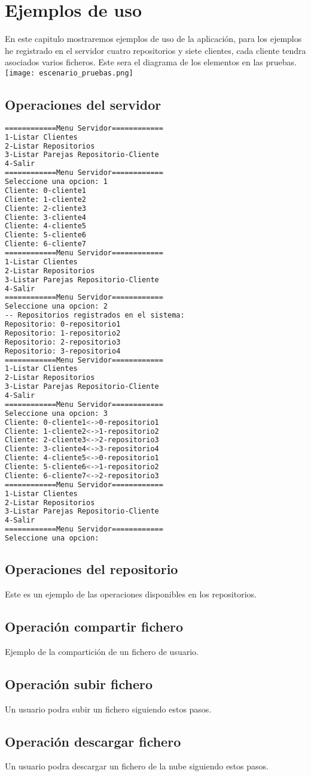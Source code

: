 \chapter{Ejemplos de uso}

En este capitulo mostraremos ejemplos de uso de la aplicación, para los ejemplos he registrado en el servidor cuatro repositorios y siete clientes, cada cliente tendra asociados varios ficheros.
Este sera el diagrama de los elementos en las pruebas.
\texttt{[image: escenario\_pruebas.png]}


\section{Operaciones del servidor}
\begin{lstlisting}[language=bash,frame=single,texcl=true,basicstyle=\small]
============Menu Servidor============
1-Listar Clientes
2-Listar Repositorios
3-Listar Parejas Repositorio-Cliente
4-Salir
============Menu Servidor============
Seleccione una opcion: 1
Cliente: 0-cliente1
Cliente: 1-cliente2
Cliente: 2-cliente3
Cliente: 3-cliente4
Cliente: 4-cliente5
Cliente: 5-cliente6
Cliente: 6-cliente7
============Menu Servidor============
1-Listar Clientes
2-Listar Repositorios
3-Listar Parejas Repositorio-Cliente
4-Salir
============Menu Servidor============
Seleccione una opcion: 2
-- Repositorios registrados en el sistema: 
Repositorio: 0-repositorio1
Repositorio: 1-repositorio2
Repositorio: 2-repositorio3
Repositorio: 3-repositorio4
============Menu Servidor============
1-Listar Clientes
2-Listar Repositorios
3-Listar Parejas Repositorio-Cliente
4-Salir
============Menu Servidor============
Seleccione una opcion: 3
Cliente: 0-cliente1<->0-repositorio1
Cliente: 1-cliente2<->1-repositorio2
Cliente: 2-cliente3<->2-repositorio3
Cliente: 3-cliente4<->3-repositorio4
Cliente: 4-cliente5<->0-repositorio1
Cliente: 5-cliente6<->1-repositorio2
Cliente: 6-cliente7<->2-repositorio3
============Menu Servidor============
1-Listar Clientes
2-Listar Repositorios
3-Listar Parejas Repositorio-Cliente
4-Salir
============Menu Servidor============
Seleccione una opcion: 
\end{lstlisting}


\section{Operaciones del repositorio}
Este es un ejemplo de las operaciones disponibles en los repositorios.

\section{Operación compartir fichero}
Ejemplo de la compartición de un fichero de usuario.

\section{Operación subir fichero}
Un usuario podra subir un fichero siguiendo estos pasos.

\section{Operación descargar fichero}
Un usuario podra descargar un fichero de la nube siguiendo estos pasos.
